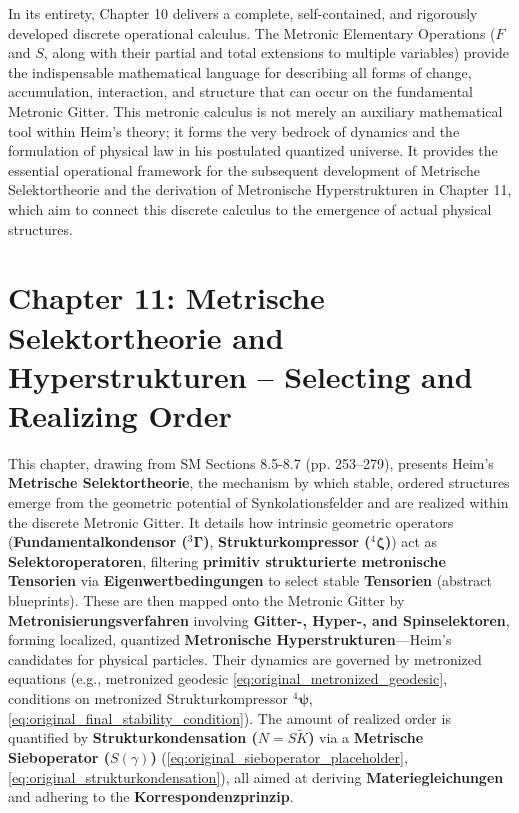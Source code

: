 \documentclass[12pt]{article}
\newcommand{\fundamentalkondensor}{{}^3\bm{\Gamma}}
\newcommand{\metrondifferential}{F} %
\newcommand{\metronintegral}{S} %
\newcommand{\metrischesieboperator}{S(\gamma)}
\newcommand{\strukturkompressor}{{}^4\bm{\zeta}}
\newcommand{\metronischerstrukturkompressor}{{}^4\bm{\psi}} %
\begin{document}
In its entirety, Chapter 10 delivers a complete, self-contained, and rigorously developed discrete operational calculus. The Metronic Elementary Operations (\( \metrondifferential \) and \( \metronintegral \), along with their partial and total extensions to multiple variables) provide the indispensable mathematical language for describing all forms of change, accumulation, interaction, and structure that can occur on the fundamental Metronic Gitter. This metronic calculus is not merely an auxiliary mathematical tool within Heim's theory; it forms the very bedrock of dynamics and the formulation of physical law in his postulated quantized universe. It provides the essential operational framework for the subsequent development of Metrische Selektortheorie and the derivation of Metronische Hyperstrukturen in Chapter 11, which aim to connect this discrete calculus to the emergence of actual physical structures.

\clearpage 
\section{Chapter 11: Metrische Selektortheorie and Hyperstrukturen – Selecting and Realizing Order}
\label{sec:chapter11}

This chapter, drawing from SM Sections 8.5-8.7 (pp. 253–279), presents Heim's \textbf{Metrische Selektortheorie}, the mechanism by which stable, ordered structures emerge from the geometric potential of Synkolationsfelder and are realized within the discrete Metronic Gitter. It details how intrinsic geometric operators (\textbf{Fundamentalkondensor (\(\fundamentalkondensor\))}, \textbf{Strukturkompressor (\(\strukturkompressor\))}) act as \textbf{Selektoroperatoren}, filtering \textbf{primitiv strukturierte metronische Tensorien} via \textbf{Eigenwertbedingungen} to select stable \textbf{Tensorien} (abstract blueprints). These are then mapped onto the Metronic Gitter by \textbf{Metronisierungsverfahren} involving \textbf{Gitter-, Hyper-, and Spinselektoren}, forming localized, quantized \textbf{Metronische Hyperstrukturen}—Heim's candidates for physical particles. Their dynamics are governed by metronized equations (e.g., metronized geodesic \eqref{eq:original_metronized_geodesic}, conditions on metronized Strukturkompressor \(\metronischerstrukturkompressor\), \eqref{eq:original_final_stability_condition}). The amount of realized order is quantified by \textbf{Strukturkondensation (\(N = S\tilde{K}\))} via a \textbf{Metrische Sieboperator (\(\metrischesieboperator\))} (\eqref{eq:original_sieboperator_placeholder}, \eqref{eq:original_strukturkondensation}), all aimed at deriving \textbf{Materiegleichungen} and adhering to the \textbf{Korrespondenzprinzip}.
\end{document}
